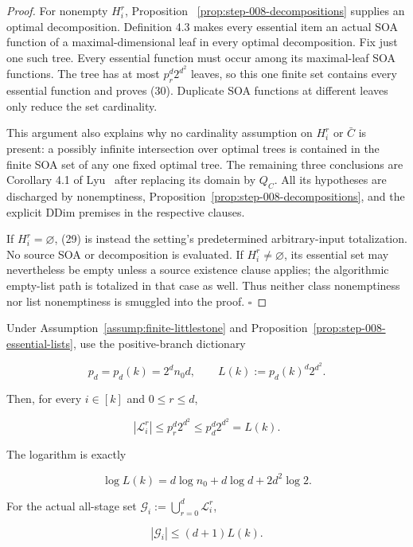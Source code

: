 \begin{proof}
For nonempty \(H_i^r\), Proposition
~\ref{prop:step-008-decompositions} supplies an optimal decomposition.
Definition 4.3 makes every essential item an actual SOA function of a
maximal-dimensional leaf in every optimal decomposition. Fix just one such
tree. Every essential function must occur among its maximal-leaf SOA
functions. The tree has at most \(p_r^d2^{d^2}\) leaves, so this one finite
set contains every essential function and proves (30). Duplicate SOA
functions at different leaves only reduce the set cardinality.

This argument also explains why no cardinality assumption on \(H_i^r\) or
\(\bar C\) is present: a possibly infinite intersection over optimal trees
is contained in the finite SOA set of any one fixed optimal tree. The
remaining three conclusions are Corollary 4.1 of Lyu~\citep{lyu2025} after
replacing its domain by \(Q_C\). All its hypotheses are discharged by
nonemptiness, Proposition~\ref{prop:step-008-decompositions}, and the
explicit DDim premises in the respective clauses.

If \(H_i^r=\varnothing\), (29) is instead the setting's predetermined
arbitrary-input totalization. No source SOA or decomposition is evaluated.
If \(H_i^r\ne\varnothing\), its essential set may nevertheless be empty
unless a source existence clause applies; the algorithmic empty-list path
is totalized in that case as well. Thus neither class nonemptiness nor list
nonemptiness is smuggled into the proof. \(\square\)


\end{proof}

\begin{proposition}\label{prop:step-008-list-envelope}
Under Assumption~\ref{assump:finite-littlestone} and
Proposition~\ref{prop:step-008-essential-lists}, use the 
positive-branch dictionary

\[
 p_d=p_d(k)=2^dn_0d,\qquad
 L(k):=p_d(k)^d2^{d^2}.
\tag{31}
\]

Then, for every \(i\in[k]\) and \(0\le r\le d\),

\[
 |\mathcal L_i^r|
 \le p_r^d2^{d^2}
 \le p_d^d2^{d^2}
 =L(k).
\tag{32}
\]

The logarithm is exactly

\[
 \log L(k)
 =d\log n_0+d\log d+2d^2\log2.
\tag{33}
\]

For the actual all-stage set
\(\mathcal G_i:=\bigcup_{r=0}^d\mathcal L_i^r\),

\[
 |\mathcal G_i|\le(d+1)L(k).
\tag{34}
\]


\end{proposition}

